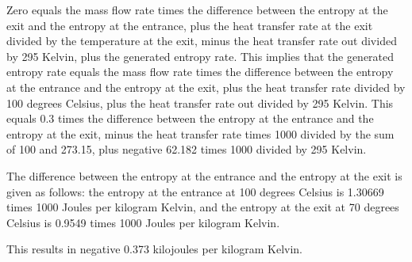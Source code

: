 Zero equals the mass flow rate times the difference between the entropy at the exit and the entropy at the entrance, plus the heat transfer rate at the exit divided by the temperature at the exit, minus the heat transfer rate out divided by 295 Kelvin, plus the generated entropy rate. This implies that the generated entropy rate equals the mass flow rate times the difference between the entropy at the entrance and the entropy at the exit, plus the heat transfer rate divided by 100 degrees Celsius, plus the heat transfer rate out divided by 295 Kelvin. This equals 0.3 times the difference between the entropy at the entrance and the entropy at the exit, minus the heat transfer rate times 1000 divided by the sum of 100 and 273.15, plus negative 62.182 times 1000 divided by 295 Kelvin.

The difference between the entropy at the entrance and the entropy at the exit is given as follows: the entropy at the entrance at 100 degrees Celsius is 1.30669 times 1000 Joules per kilogram Kelvin, and the entropy at the exit at 70 degrees Celsius is 0.9549 times 1000 Joules per kilogram Kelvin.

This results in negative 0.373 kilojoules per kilogram Kelvin.